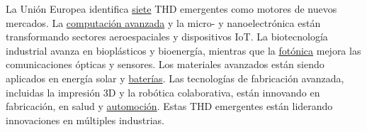 



La Unión Europea identifica \textcolor{waveBlue2}{\underline{siete}} THD emergentes como motores de nuevos mercados.  
La \textcolor{waveBlue2}{\underline{computación avanzada}} y la micro- y nanoelectrónica están transformando sectores aeroespaciales y dispositivos IoT. 
La biotecnología industrial avanza en bioplásticos y bioenergía, mientras que la \textcolor{waveBlue2}{\underline{fotónica}} mejora las comunicaciones ópticas y sensores.  
Los materiales avanzados están siendo aplicados en energía solar y \textcolor{waveBlue2}{\underline{baterías}}. 
Las tecnologías de fabricación avanzada, incluidas la impresión 3D y la robótica colaborativa, están innovando en fabricación, en salud y \textcolor{waveBlue2}{\underline{automoción}}. 
Estas THD emergentes están liderando innovaciones en múltiples industrias.

